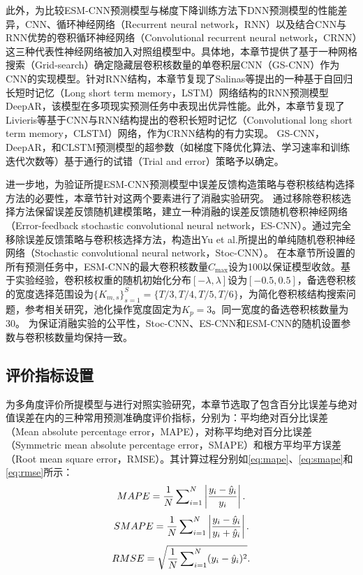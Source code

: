 此外，为比较ESM-CNN预测模型与梯度下降训练方法下DNN预测模型的性能差异，CNN、循环神经网络（Recurrent neural network，RNN）以及结合CNN与RNN优势的卷积循环神经网络（Convolutional recurrent neural network，CRNN）这三种代表性神经网络被加入对照组模型中。具体地，本章节提供了基于一种网格搜索（Grid-search）确定隐藏层卷积核数量的单卷积层CNN（GS-CNN）作为CNN的实现模型。针对RNN结构，本章节复现了Salinas等\cite{salinasDeepAR2020}提出的一种基于自回归长短时记忆（Long short term memory，LSTM）网络结构的RNN预测模型DeepAR，该模型在多项现实预测任务中表现出优异性能。此外，本章节复现了Livieris等\cite{livieris2020cnn}基于CNN与RNN结构提出的卷积长短时记忆（Convolutional long short term memory，CLSTM）网络，作为CRNN结构的有力实现。
GS-CNN，DeepAR，和CLSTM预测模型的超参数（如梯度下降优化算法、学习速率和训练迭代次数等）基于通行的试错（Trial and error）策略予以确定。

进一步地，为验证所提ESM-CNN预测模型中误差反馈构造策略与卷积核结构选择方法的必要性，本章节针对这两个要素进行了消融实验研究。
通过移除卷积核选择方法保留误差反馈随机建模策略，建立一种消融的误差反馈随机卷积神经网络（Error-feedback stochastic convolutional neural network，ES-CNN）。通过完全移除误差反馈策略与卷积核选择方法，构造出Yu et al.\cite{yuImpact2019}所提出的单纯随机卷积神经网络（Stochastic convolutional neural network，Stoc-CNN）。
在本章节所设置的所有预测任务中，ESM-CNN的最大卷积核数量$C_{\max}$设为100以保证模型收敛。基于实验经验，卷积核权重的随机初始化分布$[-\lambda,\lambda]$设为$[-0.5,0.5]$，备选卷积核的宽度选择范围设为$ \{K_{m,s}\} ^S_{s=1} = \{T/3, T/4, T/5, T/6\}$，为简化卷积核结构搜索问题，参考相关研究\cite{zhao2017convolutional}，池化操作宽度固定为$K_p=3$。同一宽度的备选卷积核数量为30。
为保证消融实验的公平性，Stoc-CNN、ES-CNN和ESM-CNN的随机设置参数与卷积核数量均保持一致。

\subsection{评价指标设置}
为多角度评价所提模型与进行对照实验研究，本章节选取了包含百分比误差与绝对值误差在内的三种常用预测准确度评价指标\cite{baoPSOMISMO2014,guo2016robust,zhaoDeep2017}，分别为：平均绝对百分比误差（Mean absolute percentage error，MAPE），对称平均绝对百分比误差（Symmetric mean absolute percentage error，SMAPE）和根方平均平方误差（Root mean square error，RMSE）。其计算过程分别如\autoref{eq:mape}、\autoref{eq:smape}和\autoref{eq:rmse}所示：
\begin{equation}
	\label{eq:mape}
	MAPE = \frac1N \sideset{}{_{i=1}^N} \sum \left \lvert\frac{y_{i} - \hat  y_{i}}{y_i} \right \rvert.
\end{equation}
\begin{equation}
	\label{eq:smape}
	SMAPE = \frac1N \sideset{}{_{i=1}^N} \sum \left \lvert\frac{y_{i} - \hat  y_{i}}{y_i + \hat  y_{i}} \right \rvert.
\end{equation}
\begin{equation}
	\label{eq:rmse}
	RMSE = \sqrt{\frac1N \sideset{}{_{i=1}^N} \sum ({y_{i} - \hat  y_{i}})^2 }.
\end{equation}

